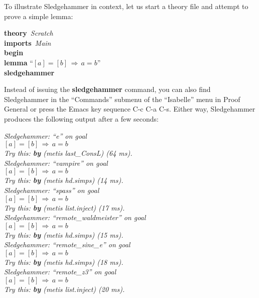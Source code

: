 \documentclass[a4paper,12pt]{article}
\begin{document}
To illustrate Sledgehammer in context, let us start a theory file and
attempt to prove a simple lemma:

\prew
\textbf{theory}~\textit{Scratch} \\
\textbf{imports}~\textit{Main} \\
\textbf{begin} \\[2\smallskipamount]
%
\textbf{lemma} ``$[a] = [b] \,\Longrightarrow\, a = b$'' \\
\textbf{sledgehammer}
\postw

Instead of issuing the \textbf{sledgehammer} command, you can also find
Sledgehammer in the ``Commands'' submenu of the ``Isabelle'' menu in Proof
General or press the Emacs key sequence C-c C-a C-s.
Either way, Sledgehammer produces the following output after a few seconds:

\prew
\slshape
Sledgehammer: ``\textit{e}'' on goal \\
$[a] = [b] \,\Longrightarrow\, a = b$ \\
Try this: \textbf{by} (\textit{metis last\_ConsL}) (64 ms). \\[3\smallskipamount]
%
Sledgehammer: ``\textit{vampire}'' on goal \\
$[a] = [b] \,\Longrightarrow\, a = b$ \\
Try this: \textbf{by} (\textit{metis hd.simps}) (14 ms). \\[3\smallskipamount]
%
Sledgehammer: ``\textit{spass}'' on goal \\
$[a] = [b] \,\Longrightarrow\, a = b$ \\
Try this: \textbf{by} (\textit{metis list.inject}) (17 ms). \\[3\smallskipamount]
%
Sledgehammer: ``\textit{remote\_waldmeister}'' on goal \\
$[a] = [b] \,\Longrightarrow\, a = b$ \\
Try this: \textbf{by} (\textit{metis hd.simps}) (15 ms). \\[3\smallskipamount]
%
Sledgehammer: ``\textit{remote\_sine\_e}'' on goal \\
$[a] = [b] \,\Longrightarrow\, a = b$ \\
Try this: \textbf{by} (\textit{metis hd.simps}) (18 ms). \\[3\smallskipamount]
%
Sledgehammer: ``\textit{remote\_z3}'' on goal \\
$[a] = [b] \,\Longrightarrow\, a = b$ \\
Try this: \textbf{by} (\textit{metis list.inject}) (20 ms).
\postw
\end{document}
